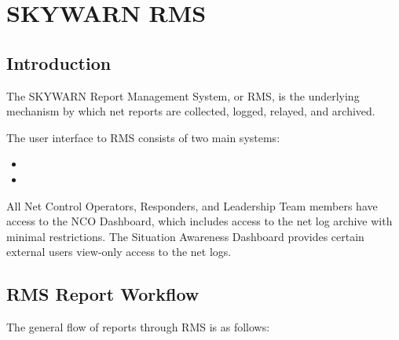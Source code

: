 \documentclass[pdflatex,letterpaper,twoside,12pt]{book}
\begin{document}
\chapter{SKYWARN RMS}\label{rms}


\section{Introduction}

The SKYWARN Report Management System, or RMS, is the underlying mechanism by which net reports are collected, logged, relayed, and archived.

The user interface to RMS consists of two main systems:

\begin{itemize}
\item {}
\item {}
\end{itemize}

All Net Control Operators, Responders, and Leadership Team members have access to the NCO Dashboard, which includes access to the net log archive with minimal restrictions.  The Situation Awareness Dashboard provides certain external users view-only access to the net logs.


\section{RMS Report Workflow}

The general flow of reports through RMS is as follows:
\end{document}
